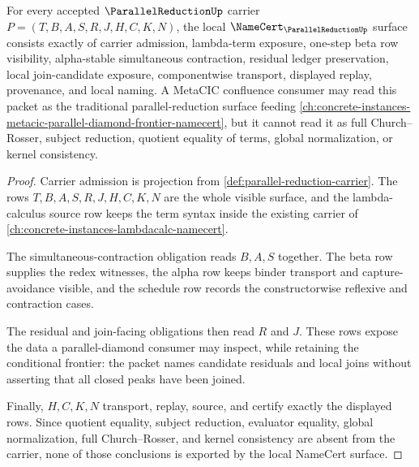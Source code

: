 \begin{theorem}
\label{thm:parallel-reduction-namecert-obligations}
For every accepted $\ParallelReductionUp$ carrier $P=(T,B,A,S,R,J,H,C,K,N)$, the local $\NameCert_{\ParallelReductionUp}$ surface consists exactly of carrier admission, lambda-term exposure, one-step beta row visibility, alpha-stable simultaneous contraction, residual ledger preservation, local join-candidate exposure, componentwise transport, displayed replay, provenance, and local naming. A MetaCIC confluence consumer may read this packet as the traditional parallel-reduction surface feeding \autoref{ch:concrete-instances-metacic-parallel-diamond-frontier-namecert}, but it cannot read it as full Church--Rosser, subject reduction, quotient equality of terms, global normalization, or kernel consistency.
\end{theorem}
\begin{proof}
Carrier admission is projection from \autoref{def:parallel-reduction-carrier}. The rows $T,B,A,S,R,J,H,C,K,N$ are the whole visible surface, and the lambda-calculus source row keeps the term syntax inside the existing carrier of \autoref{ch:concrete-instances-lambdacalc-namecert}.

The simultaneous-contraction obligation reads $B,A,S$ together. The beta row supplies the redex witnesses, the alpha row keeps binder transport and capture-avoidance visible, and the schedule row records the constructorwise reflexive and contraction cases.

The residual and join-facing obligations then read $R$ and $J$. These rows expose the data a parallel-diamond consumer may inspect, while retaining the conditional frontier: the packet names candidate residuals and local joins without asserting that all closed peaks have been joined.

Finally, $H,C,K,N$ transport, replay, source, and certify exactly the displayed rows. Since quotient equality, subject reduction, evaluator equality, global normalization, full Church--Rosser, and kernel consistency are absent from the carrier, none of those conclusions is exported by the local NameCert surface.
\end{proof}

